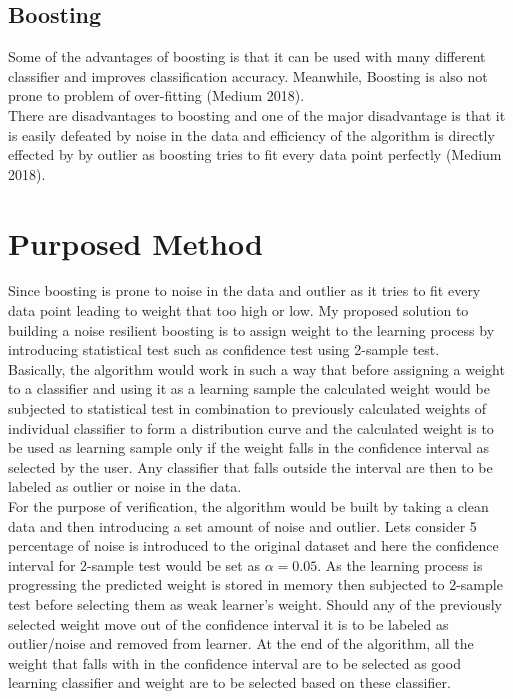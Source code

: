 \documentclass{article}
\begin{document}
\subsection{Boosting}\label{SEC:boosting}
Some of the advantages of boosting is that it can be used with many different classifier and improves classification accuracy. Meanwhile, Boosting is also not prone to problem of over-fitting (Medium 2018).\\

There are disadvantages to boosting and one of the major disadvantage is that it is easily defeated by noise in the data and efficiency of the algorithm is directly effected by by outlier as boosting tries to fit every data point perfectly (Medium 2018).

\section{Purposed Method}
Since boosting is prone to noise in the data and outlier as it tries to fit every data point leading to weight that too high or low. My proposed solution to building a noise resilient boosting is to assign weight to the learning process by introducing statistical test such as confidence test using 2-sample test.\\

Basically, the algorithm would work in such a way that before assigning a weight to a classifier and using it as a learning sample the calculated weight would be subjected to statistical test in combination to previously calculated weights of individual classifier to form a distribution curve and the calculated weight is to be used as learning sample only if the weight falls in the confidence interval as selected by the user. Any classifier that falls outside the interval are then to be labeled as outlier or noise in the data.\\ 

For the purpose of verification, the algorithm would be built by taking a clean data and then introducing a set amount of noise and outlier. Lets consider 5 percentage of noise is introduced to the original dataset and here the confidence interval for 2-sample test would be set as ${\alpha = 0.05}$. As the learning process is progressing the predicted weight is stored in memory then subjected to 2-sample test before selecting them as weak learner's weight. Should any of the previously selected weight move out of the confidence interval it is to be labeled as outlier/noise and removed from learner. At the end of the algorithm, all the weight that falls with in the confidence interval are to be selected as good learning classifier and weight are to be selected based on these classifier. \\
\end{document}
